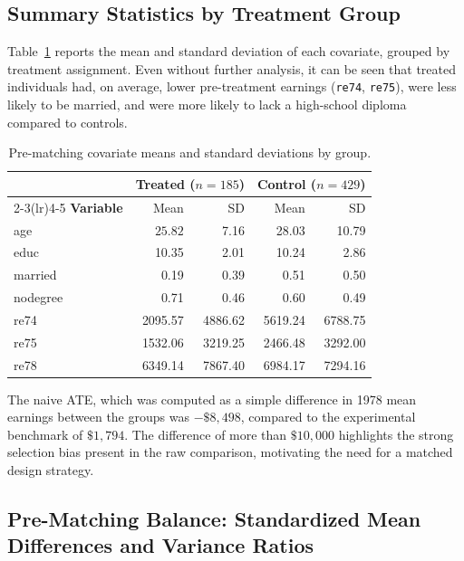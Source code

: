 \documentclass[12pt, a4paper]{article}
\begin{document}
\subsection{Summary Statistics by Treatment Group}

Table~\ref{tab:summary} reports the mean and standard deviation of each covariate, grouped by treatment assignment. Even without further analysis, it can be seen that treated individuals had, on average, lower pre-treatment earnings (\texttt{re74}, \texttt{re75}), were less likely to be married, and were more likely to lack a high-school diploma compared to controls.

\begin{table}[H]
  \centering
  \caption{Pre-matching covariate means and standard deviations by group.}
  \label{tab:summary}
  \begin{tabular}{lrrrr}
    \toprule
    & \multicolumn{2}{c}{\textbf{Treated} ($n=185$)}
    & \multicolumn{2}{c}{\textbf{Control} ($n=429$)} \\
    \cmidrule(lr){2-3}\cmidrule(lr){4-5}
    \textbf{Variable} & Mean & SD & Mean & SD \\
    \midrule
    age       & $25.82$& 7.16& 28.03& 10.79\\
    educ      & 10.35& 2.01& 10.24& 2.86\\
    married   & 0.19& 0.39& 0.51& 0.50\\
    nodegree  & 0.71& 0.46& 0.60& 0.49\\
    re74      & 2095.57& 4886.62& 5619.24& 6788.75\\
    re75      & 1532.06& 3219.25& 2466.48& 3292.00\\
    re78      & 6349.14& 7867.40& 6984.17& 7294.16
\\
    \bottomrule
  \end{tabular}
\end{table}

The naive ATE, which was computed as a simple difference in 1978 mean earnings  between the groups was $-\$8{,}498$, compared to the experimental benchmark of $\$1{,}794$. The difference of more than $\$10{,}000$ highlights the strong selection bias present in the raw comparison, motivating the need for a matched design strategy.

\subsection{Pre-Matching Balance: Standardized Mean Differences and Variance Ratios}
\end{document}
